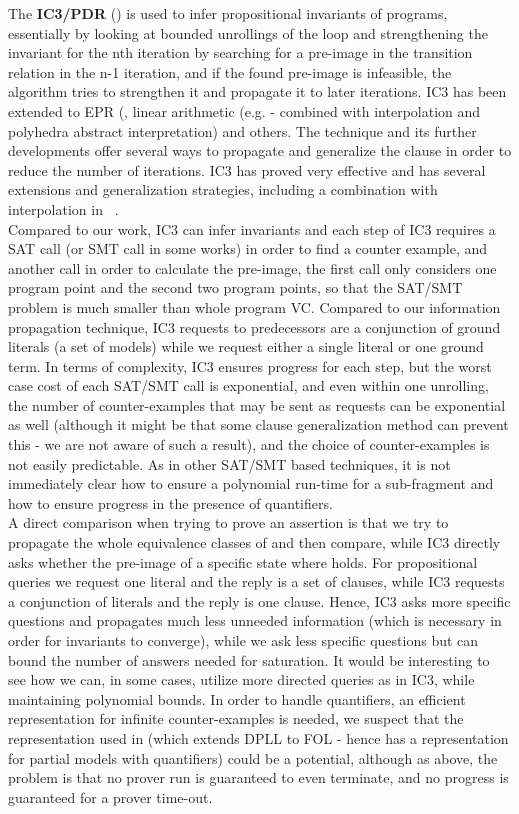 The \textbf{IC3/PDR} (\cite{Bradley12}) is used to infer propositional invariants of programs, essentially by looking at bounded unrollings of the loop and strengthening the invariant for the nth iteration by searching for a pre-image in the transition relation in the n-1 iteration, and if the found pre-image is infeasible, the algorithm tries to strengthen it and propagate it to later iterations.
IC3 has been extended to EPR (\cite{BjornerGurfinkelKorovinLahav2013}, linear arithmetic (e.g. \cite{BjornerGurfinkel2015} - combined with interpolation and polyhedra abstract interpretation) and others.
The technique and its further developments offer several ways to propagate and generalize the clause in order to reduce the number of iterations.
IC3 has proved very effective and has several extensions and generalization strategies, including a combination with interpolation in ~\cite{VizelGurfinkel2014}.\\
Compared to our work, IC3 can infer invariants and each step of IC3 requires a SAT call (or SMT call in some works) in order to find a counter example, and another call in order to calculate the pre-image, the first call only considers one program point and the second two program points, so that the SAT/SMT problem is much smaller than whole program VC.
Compared to our information propagation technique, 
IC3 requests to predecessors are a conjunction of ground literals (a set of models) while we request either a single literal or one ground term. In terms of complexity, IC3 ensures progress for each step, but the worst case cost of each SAT/SMT call is exponential, and even within one unrolling, the number of counter-examples that may be sent as requests can be exponential as well (although it might be that some clause generalization method can prevent this - we are not aware of such a result), and the choice of counter-examples is not easily predictable. As in other SAT/SMT based techniques, it is not immediately clear how to ensure a polynomial run-time for a sub-fragment and how to ensure progress in the presence of quantifiers.\\
A direct comparison when trying to prove an assertion  is that we try to propagate the whole equivalence classes of  and then compare, while IC3 directly asks whether the pre-image of a specific state where  holds. 
For propositional queries we request one literal and the reply is a set of clauses, while IC3 requests a conjunction of literals and the reply is one clause. Hence, IC3 asks more specific questions and propagates much less unneeded information (which is necessary in order for invariants to converge), while we ask less specific questions but can bound the number of answers needed for saturation. It would be interesting to see how we can, in some cases, utilize more directed queries as in IC3, while maintaining polynomial bounds.
In order to handle quantifiers, an efficient representation for infinite counter-examples is needed, we suspect that the representation used in \cite{BaumgartnerPelzerTinelli12} (which extends DPLL to FOL - hence has a representation for partial models with quantifiers) could be a potential, although as above, the problem is that no prover run is guaranteed to even terminate, and no progress is guaranteed for a prover time-out.

